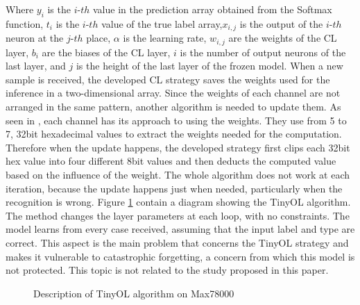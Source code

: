 \quad Where $ y_i $ is the $i$-$th$ value in the prediction array obtained from the Softmax function, $t_i$ is the $i$-$th$ value of the true label array,$x_{i,j}$ is the output of the $i$-$th$ neuron at the $j$-$th$ place, $\alpha$ is the learning rate, $w_{i,j}$ are the weights of the CL layer, $b_i$ are the biases of the CL layer, $i$ is the number of output neurons of the last layer, and $j$ is the height of the last layer of the frozen model. When a new sample is received, the developed CL strategy saves the weights used for the inference in a two-dimensional array. 
\quad Since the weights of each channel are not arranged in the same pattern, another algorithm is needed to update them. As seen in \cite{Continual_Learning_on_Max78000_Microcontroller}, each channel has its approach to using the weights. They use from 5 to 7, 32bit hexadecimal values to extract the weights needed for the computation. Therefore when the update happens, the developed strategy first clips each 32bit hex value into four different 8bit values and then deducts the computed value based on the influence of the weight. The whole algorithm does not work at each iteration, because the update happens just when needed, particularly when the recognition is wrong. Figure \ref{CL_system} contain a diagram showing the TinyOL algorithm.
The method changes the layer parameters at each loop, with no constraints. The model learns from every case received, assuming that the input label and type are correct. This aspect is the main problem that concerns the TinyOL strategy and makes it vulnerable to catastrophic forgetting, a concern from which this model is not protected. This topic is not related to the study proposed in this paper. 

\begin{figure}[!ht]
\centerline{}
\caption{Description of TinyOL algorithm on Max78000}
\label{CL_system}
\end{figure}
    



\clearpage
\newpage
\mbox{~}
\clearpage
\newpage

